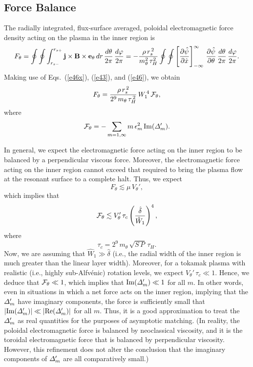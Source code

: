 \documentclass[12pt,prb,aps]{revtex4-1}
\begin{document}
\subsection{Force Balance}
The radially integrated, flux-surface averaged, poloidal electromagnetic force density acting on the
plasma in the inner region is
\begin{equation}
F_\theta = \oint\oint\int_{r_{s-}}^{r_{s+}}{\bf j}\times {\bf B}\times {\bf e}_\theta\,dr\,\frac{d\theta}{2\pi}\,\frac{d\varphi}{2\pi} =-\frac{\rho\,r_s^{\,2}}{m_\theta^2\,\tau_H^2}\oint\oint\left[\frac{\partial\hat{\psi}}{\partial\hat{x}}\right]_{-\infty}^\infty\,\frac{\partial\hat{\psi}}{\partial \theta}\,\frac{d\theta}{2\pi}\,\frac{d\varphi}{2\pi}.
\end{equation}
Making use of Eqs.~(\ref{e46x}), (\ref{e43}), and (\ref{e46}), we obtain
\begin{equation}
F_\theta = \frac{\rho\,r_s^{\,2}}{2^9\,m_\theta\,\tau_H^{\,2}}\,W_1^{\,4}\,{\cal F}_\theta,
\end{equation}
where
\begin{equation}
{\cal F}_\theta =-\sum_{m=1,\infty}m\,\epsilon_m^2\,{\rm Im}({\mit\Delta}_m').
\end{equation}

In general, we expect the electromagnetic force acting on the inner region to be balanced by a perpendicular viscous force. Moreover, the electromagnetic force acting on the inner region cannot exceed that required to bring the plasma flow at the resonant surface to a complete halt.\cite{rf0} Thus, we expect
\begin{equation}
F_\theta \lesssim \mu\,V_\theta',
\end{equation}
which implies that
\begin{equation}
{\cal F}_\theta \lesssim V_\theta'\,\tau_c\left(\frac{\hat{\delta}}{\hat{W}_1}\right)^4,
\end{equation}
where
\begin{equation}
\tau_c = 2^9\,m_\theta\,\sqrt{S\,P}\,\tau_H.
\end{equation}
Now, we are assuming that $\hat{W}_1\gg \hat{\delta}$ (i.e., the radial width of the inner region is much greater than the linear layer width). Moreover, for a tokamak plasma with realistic (i.e., highly sub-Alfv\'{e}nic) rotation levels, we expect $V_\theta'\,\tau_c\ll 1$. Hence, we deduce that ${\cal F}_\theta\ll 1$, which
implies that ${\rm Im}({\mit\Delta}_m')\ll 1$ for all $m$. In other words, even in situations in which a net force acts on the
inner region, implying that the ${\mit\Delta}_m'$ have imaginary components, the force is sufficiently small that  $|{\rm Im}({\mit\Delta}_m')|\ll |{\rm Re}({\mit\Delta}_m')|$ for all $m$. 
Thus, it is a good approximation to treat the ${\mit\Delta}_m'$ as real quantities for the purposes of asymptotic matching. 
(In reality, the poloidal electromagnetic force is balanced by neoclassical viscosity, and it is the toroidal electromagnetic force that is balanced by perpendicular viscosity. However, this
refinement does not alter the conclusion that the imaginary components of ${\mit\Delta}_m'$ are all comparatively small.)
\end{document}
